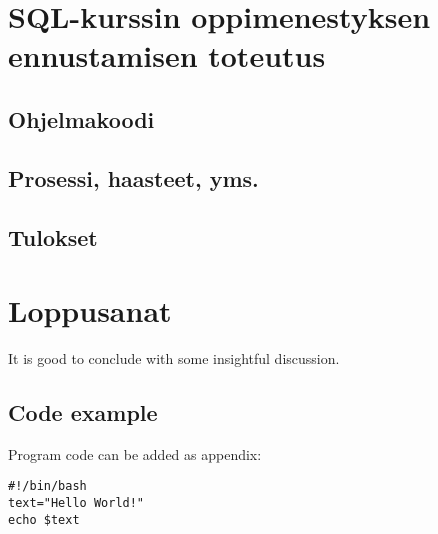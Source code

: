 \documentclass[finnish,twoside,openright]{HYgraduMLDS}
\begin{document}
\chapter{SQL-kurssin oppimenestyksen ennustamisen toteutus}

\section{Ohjelmakoodi}


\section{Prosessi, haasteet, yms.}


\section{Tulokset}


\chapter{Loppusanat\label{chapter:Loppusanat}}

It is good to conclude with some insightful discussion. 


\cleardoublepage %



\begin{appendices}
\myappendixtitle

\chapter{Code example\label{appendix:code}}
Program code can be added as appendix:
\begin{verbatim}
#!/bin/bash          
text="Hello World!"
echo $text
\end{verbatim}

\end{appendices}
\end{document}
